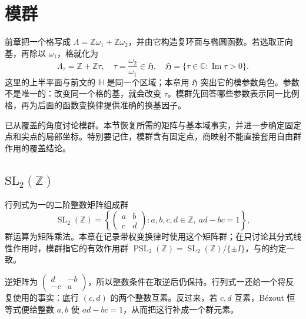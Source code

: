 \section{模群}
\label{b3:sec:2301}

前章把一个格写成 \(\Lambda=\mathbb Z\omega_1+\mathbb Z\omega_2\)，并由它构造复环面与椭圆函数。若选取正向基，再除以 \(\omega_1\)，格就化为
\[
 \Lambda_\tau=\mathbb Z+\mathbb Z\tau,
 \quad \tau=\frac{\omega_2}{\omega_1}\in\mathfrak H,
 \quad \mathfrak H=\{\tau\in\mathbb C:\operatorname{Im}\tau>0\}.
\]
这里的上半平面与前文的 \(\mathbb H\) 是同一个区域；本章用 \(\mathfrak H\) 突出它的模参数角色。参数不是唯一的：改变同一个格的基，就会改变 \(\tau\)。模群先回答哪些参数表示同一比例格，再为后面的函数变换律提供准确的换基因子。

已从覆盖的角度讨论模群。本节恢复所需的矩阵与基本域事实，并进一步确定固定点和尖点的局部坐标。特别要记住，模群含有固定点，商映射不能直接套用自由群作用的覆盖结论。

\subsection{\texorpdfstring{\(\mathrm{SL}_2(\mathbb Z)\)}{SL2(Z)}}
\label{b3:subsec:230101}

\begin{definition}\label{b3:def:23-modular-group}
行列式为一的二阶整数矩阵组成群
\[
 \operatorname{SL}_2(\mathbb Z)
 =\left\{\begin{pmatrix}a&b\\c&d\end{pmatrix}:
       a,b,c,d\in\mathbb Z,\ ad-bc=1\right\},
\]
群运算为矩阵乘法。本章在记录带权变换律时使用这个矩阵群；在只讨论其分式线性作用时，模群指它的有效作用群
\(\operatorname{PSL}_2(\mathbb Z)=\operatorname{SL}_2(\mathbb Z)/\{\pm I\}\)，与的约定一致。
\end{definition}

逆矩阵为 \(\left(\begin{smallmatrix}d&-b\\-c&a\end{smallmatrix}\right)\)，所以整数条件在取逆后仍保持。行列式一还给一个将反复使用的事实：底行 \((c,d)\) 的两个整数互素。反过来，若 \(c,d\) 互素，Bézout 恒等式便给整数 \(a,b\) 使 \(ad-bc=1\)，从而把这行补成一个群元素。

